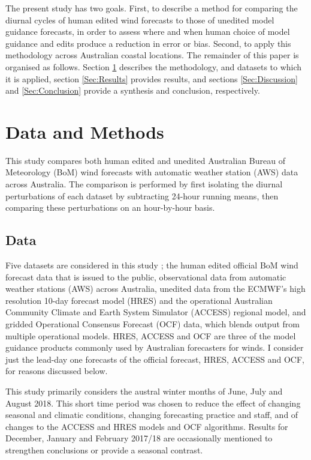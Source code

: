 \documentclass{ametsoc}
\begin{document}
The present study has two goals. First, to describe a method for comparing the diurnal cycles of human edited wind forecasts to those of unedited model guidance forecasts, in order to assess where and when human choice of model guidance and edits produce a reduction in error or bias. Second, to apply this methodology across Australian coastal locations. The remainder of this paper is organised as follows. Section \ref{Sec:Methods} describes the methodology, and datasets to which it is applied, section \ref{Sec:Results} provides results, and sections \ref{Sec:Discussion} and \ref{Sec:Conclusion} provide a synthesis and conclusion, respectively.

\section{Data and Methods} \label{Sec:Methods}
This study compares both human edited and unedited Australian Bureau of Meteorology (BoM) wind forecasts with automatic weather station (AWS) data across Australia. The comparison is performed by first isolating the diurnal perturbations of each dataset by subtracting 24-hour running means, then comparing these perturbations on an hour-by-hour basis.

\subsection{Data}
Five datasets are considered in this study \citep{shortData19}; the human edited official BoM wind forecast data that is issued to the public, observational data from automatic weather stations (AWS) across Australia, unedited data from the ECMWF's high resolution 10-day forecast model (HRES) and the operational Australian Community Climate and Earth System Simulator (ACCESS) regional model, and gridded Operational Consensus Forecast (OCF) data, which blends output from multiple operational models. HRES, ACCESS and OCF are three of the model guidance products commonly used by Australian forecasters for winds. I consider just the lead-day one forecasts of the official forecast, HRES, ACCESS and OCF, for reasons discussed below. 

This study primarily considers the austral winter months of June, July and August 2018. This short time period was chosen to reduce the effect of changing seasonal and climatic conditions, changing forecasting practice and staff, and of changes to the ACCESS and HRES models and OCF algorithms. Results for December, January and February 2017/18 are occasionally mentioned to strengthen conclusions or provide a seasonal contrast. 
\end{document}
